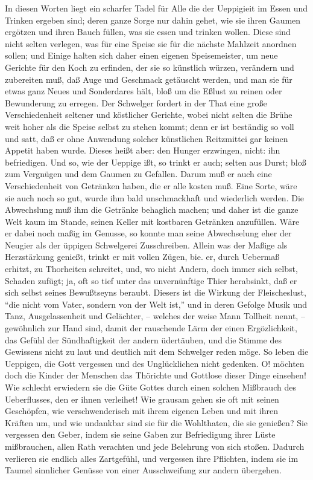 In diesen Worten liegt ein scharfer Tadel für Alle die der Ueppigieit im Essen und Trinken ergeben sind; deren ganze Sorge nur dahin gehet, wie sie ihren Gaumen ergötzen und ihren Bauch füllen, was sie essen und trinken wollen. Diese sind nicht selten verlegen, was für eine Speise sie für die nächste Mahlzeit anordnen sollen; und Einige halten sich daher einen eigenen Speisemeister, um neue Gerichte für den Koch zu erfinden, der sie so künstlich würzen, verändern und zubereiten muß, daß Auge und Geschmack getäuscht werden, und man sie für etwas ganz Neues und Sonderdares hält, bloß um die Eßlust zu reinen oder Bewunderung zu erregen. Der Schwelger fordert in der That eine große Verschiedenheit seltener und köstlicher Gerichte, wobei nicht selten die Brühe weit hoher als die Speise selbst zu stehen kommt; denn er ist beständig so voll und satt, daß er ohne Anwendung solcher künstlichen Reitzmittei gar keinen Appetit haben wurde. Dieses heißt aber: den Hunger erzwingen, nicht: ihn befriedigen. Und so, wie der Ueppige ißt, so trinkt er auch; selten aus Durst; bloß zum Vergnügen und dem Gaumen zu Gefallen. Darum muß er auch eine Verschiedenheit von Getränken haben, die er alle kosten muß. Eine Sorte, wäre sie auch noch so gut, wurde ihm bald unschmackhaft und wiederlich werden. Die Abwechslung muß ihm die Getränke behaglich machen; und daher ist die ganze Welt kaum im Stande, seinen Keller mit kostbaren Getränken anzufüllen. Wäre er dabei noch maßig im Genusse, so konnte man seine Abwechselung eher der Neugier als der üppigen Schwelgerei Zusschreiben. Allein was der Maßige als Herzstärkung genießt, trinkt er mit vollen Zügen, bie. er, durch Uebermaß erhitzt, zu Thorheiten schreitet, und, wo nicht Andern, doch immer sich selbst, Schaden zufügt; ja, oft so tief unter das unvernünftige Thier herabsinkt, daß er sich selbst seines Bewußtseyns beraubt. Diesers ist die Wirkung der Fleischeslust, "`die nicht vom Vater, sondern von der Welt ist,"' und in deren Gefolge Musik und Tanz, Ausgelassenheit und Gelächter, -- welches der weise Mann Tollheit nennt, -- gewöhnlich zur Hand sind, damit der rauschende Lärm der einen Ergözlichkeit, das Gefühl der Sündhaftigkeit der andern üdertäuben, und die Stimme des Gewissens nicht zu laut und deutlich mit dem Schwelger reden möge. So leben die Ueppigen, die Gott vergessen und des Unglücklichen nicht gedenken. O! möchten doch die Kinder der Menschen das Thörichte und Gottlose dieser Dinge einsehen! Wie schlecht erwiedern sie die Güte Gottes durch einen solchen Mißbrauch des Ueberflusses, den er ihnen verleihet! Wie grausam gehen sie oft mit seinen Geschöpfen, wie verschwenderisch mit ihrem eigenen Leben und mit ihren Kräften um, und wie undankbar sind sie für die Wohlthaten, die sie genießen? Sie vergessen den Geber, indem sie seine Gaben zur Befriedigung ihrer Lüste mißbrauchen, allen Rath verachten und jede Belehrung von sich stoßen. Dadurch verlieren sie endlich alles Zartgefühl, und vergessen ihre Pflichten, indem sie im Taumel sinnlicher Genüsse von einer Ausschweifung zur andern übergehen.

